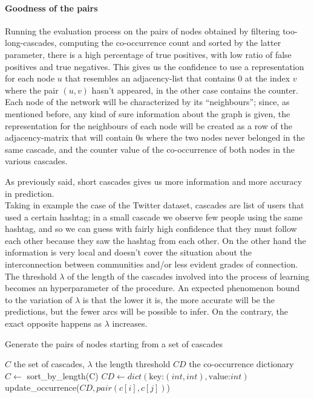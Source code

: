 \documentclass{article}
\begin{document}
			\paragraph{Goodness of the pairs}
			Running the evaluation process on the pairs of nodes obtained by filtering too-long-cascades, computing the co-occurrence count and sorted by the latter parameter, there is a high percentage of true positives, with low ratio of false positives and true negatives. This gives us the confidence to use a representation for each node $u$ that resembles an adjacency-list that contains 0 at the index $v$ where the pair $(u,v)$ hasn't appeared, in the other case contains the counter.\medskip\\
			
			Each node of the network will be characterized by its \textquotedblleft neighbours\textquotedblright; since, as mentioned before, any kind of sure information about the graph is given, the representation for the neighbours of each node will be created as a row of the adjacency-matrix that will contain 0s where the two nodes never belonged in the same cascade, and the counter value of the co-occurrence of both nodes in the various cascades.
			
			As previously said, short cascades gives us more information and more accuracy in prediction.\\
			Taking in example the case of the Twitter dataset, cascades are list of users that used a certain hashtag; in a small cascade we observe few people using the same hashtag, and so we can guess with fairly high confidence that they must follow each other because they saw the hashtag from each other. On the other hand the information is very local and doesn't cover the situation about the interconnection between communities and/or less evident grades of connection.\medskip\\
			The threshold $\lambda$ of the length of the cascades involved into the process of learning becomes an hyperparameter of the procedure. An expected phenomenon bound to the variation of $\lambda$ is that the lower it is, the more accurate will be the predictions, but the fewer arcs will be possible to infer. On the contrary, the exact opposite happens as $\lambda$ increases.
			
			\begin{algorithm}[H] %
				\caption{Generate the pairs of nodes starting from a set of cascades} %
				\label{alg1} %
				\begin{algorithmic} %
					\REQUIRE $C$ the set of cascades, $\lambda$ the length threshold
					\ENSURE $CD$ the co-occurrence dictionary
					\STATE $C \gets$ sort\_by\_length(C)
					\STATE $CD \gets dict(\text{key:} (int,int), \text{value:} int)$
								\STATE update\_occurrence($CD,pair(c[i],c[j])$)
							\ENDFOR
						\ENDFOR
					\ENDFOR
				\end{algorithmic}
			\end{algorithm}
			
\end{document}
